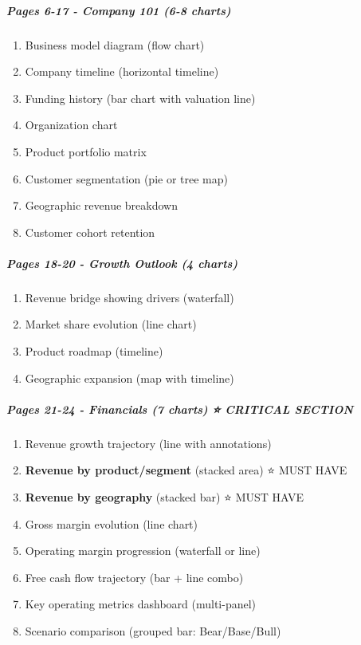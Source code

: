 \documentclass[11pt]{article}
\begin{document}
\subparagraph{Pages 6-17 - Company 101 (6-8 charts)}\mbox{}\par
\begin{enumerate}[leftmargin=*,itemsep=2pt,topsep=2pt]
\item {} Business model diagram (flow chart)
\item {} Company timeline (horizontal timeline)
\item {} Funding history (bar chart with valuation line)
\item {} Organization chart
\item {} Product portfolio matrix
\item {} Customer segmentation (pie or tree map)
\item {} Geographic revenue breakdown
\item {} Customer cohort retention
\end{enumerate}

\subparagraph{Pages 18-20 - Growth Outlook (4 charts)}\mbox{}\par
\begin{enumerate}[leftmargin=*,itemsep=2pt,topsep=2pt]
\item {} Revenue bridge showing drivers (waterfall)
\item {} Market share evolution (line chart)
\item {} Product roadmap (timeline)
\item {} Geographic expansion (map with timeline)
\end{enumerate}

\subparagraph{Pages 21-24 - Financials (7 charts) ⭐ CRITICAL SECTION}\mbox{}\par
\begin{enumerate}[leftmargin=*,itemsep=2pt,topsep=2pt]
\item {} Revenue growth trajectory (line with annotations)
\item {} \textbf{Revenue by product/segment} (stacked area) ⭐ MUST HAVE
\item {} \textbf{Revenue by geography} (stacked bar) ⭐ MUST HAVE
\item {} Gross margin evolution (line chart)
\item {} Operating margin progression (waterfall or line)
\item {} Free cash flow trajectory (bar + line combo)
\item {} Key operating metrics dashboard (multi-panel)
\item {} Scenario comparison (grouped bar: Bear/Base/Bull)
\end{enumerate}
\end{document}
